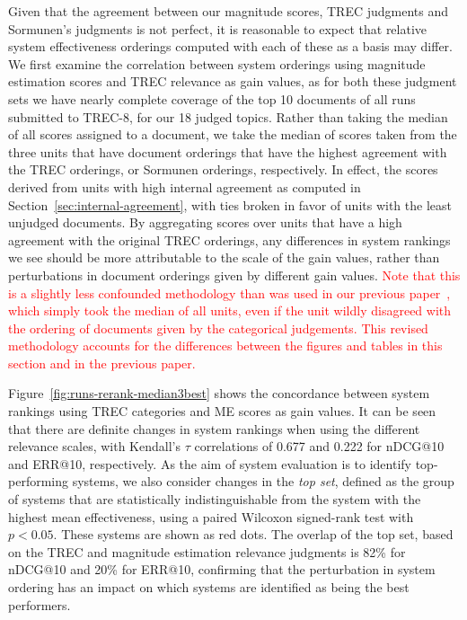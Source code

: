 Given that the agreement between our magnitude scores, TREC judgments
and Sormunen's judgments is not perfect, it is reasonable to expect
that relative system effectiveness orderings computed with each of
these as a basis may differ.
We first examine the correlation between system orderings using
magnitude estimation scores and TREC relevance as gain values, as for
both these judgment sets we have nearly complete coverage of the top 10
documents of all runs submitted to TREC-8, for our 18 judged topics.
% 
Rather than taking the median of all scores assigned to a document, we
take the median of scores taken from the three units that have document
orderings that have the highest agreement with the TREC orderings, or
Sormunen orderings, respectively.
In effect, the scores derived from units with high internal agreement as
computed in Section~\ref{sec:internal-agreement}, with ties broken in favor
of units with the least unjudged documents.
By aggregating scores over units that have a high agreement with the
original TREC orderings, any differences in system rankings we see should be more
attributable to the scale of the gain values, rather than perturbations in
document orderings given by different gain values.
\textcolor{red}{Note that this is a slightly less confounded methodology 
than was used in our previous paper~\cite{ME-SIGIR15}, which simply took the median 
of all units, even if the unit wildly disagreed with the ordering of documents
given by the categorical judgements. This revised methodology accounts for the 
differences between the figures and tables in this section and 
in the previous paper.}

Figure~\ref{fig:runs-rerank-median3best} shows the concordance between
system rankings using TREC categories and ME scores as gain values.
It can be seen that there are definite changes in system rankings when
using the different relevance scales, with Kendall's $\tau$
correlations of 0.677 and 0.222 for nDCG@10 and ERR@10, respectively.
As the aim of system evaluation is to identify top-performing systems,
we also consider changes in the \emph{top set}, defined as the group of
systems that are statistically indistinguishable from the system with
the highest mean effectiveness, using a paired Wilcoxon signed-rank
test with $p<0.05$.
These systems are shown as red dots.
The overlap of the top set, based on the TREC and magnitude estimation
relevance judgments is 82\% for nDCG@10 and 20\% for ERR@10, confirming
that the perturbation in system ordering has an impact on which systems
are identified as being the best performers.

